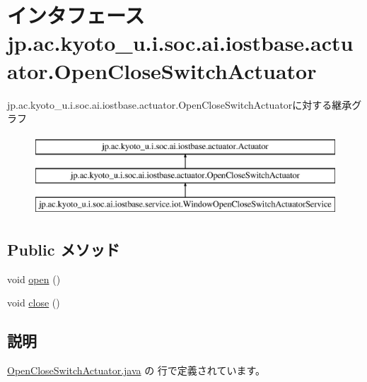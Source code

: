 \hypertarget{interfacejp_1_1ac_1_1kyoto__u_1_1i_1_1soc_1_1ai_1_1iostbase_1_1actuator_1_1_open_close_switch_actuator}{\section{インタフェース jp.\-ac.\-kyoto\-\_\-u.\-i.\-soc.\-ai.\-iostbase.\-actuator.\-Open\-Close\-Switch\-Actuator}
\label{interfacejp_1_1ac_1_1kyoto__u_1_1i_1_1soc_1_1ai_1_1iostbase_1_1actuator_1_1_open_close_switch_actuator}
}
jp.\-ac.\-kyoto\-\_\-u.\-i.\-soc.\-ai.\-iostbase.\-actuator.\-Open\-Close\-Switch\-Actuatorに対する継承グラフ\begin{figure}[H]
\begin{center}
\leavevmode
\includegraphics[height=3.000000cm]{interfacejp_1_1ac_1_1kyoto__u_1_1i_1_1soc_1_1ai_1_1iostbase_1_1actuator_1_1_open_close_switch_actuator}
\end{center}
\end{figure}
\subsection*{Public メソッド}
\begin{DoxyCompactItemize}
\item 
void \hyperlink{interfacejp_1_1ac_1_1kyoto__u_1_1i_1_1soc_1_1ai_1_1iostbase_1_1actuator_1_1_open_close_switch_actuator_a8a9e5dfe1568502663cd3a605ce4d1b2}{open} ()
\item 
void \hyperlink{interfacejp_1_1ac_1_1kyoto__u_1_1i_1_1soc_1_1ai_1_1iostbase_1_1actuator_1_1_open_close_switch_actuator_adb2a37405d175e16d1d82601c38b9f03}{close} ()
\end{DoxyCompactItemize}


\subsection{説明}


 \hyperlink{_open_close_switch_actuator_8java_source}{Open\-Close\-Switch\-Actuator.\-java} の  行で定義されています。



